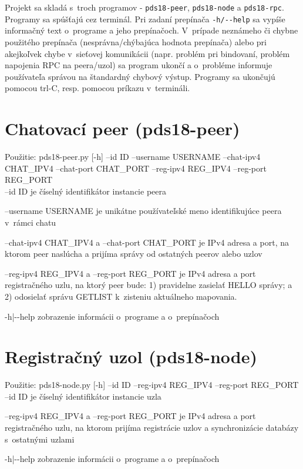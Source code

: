 Projekt sa skladá s~troch programov \-- \texttt{pds18-peer}, \texttt{pds18-node} a  \texttt{pds18-rpc}.
Programy sa spúšťajú cez terminál. Pri zadaní prepínača \texttt{-h/-{}-help} sa vypíše informačný text o~programe a jeho prepínačoch. V~prípade neznámeho či chybne použitého prepínača (nesprávna/chýbajúca hodnota prepínača) alebo pri akejkoľvek chybe v~sieťovej komunikácii (napr. problém pri bindovaní, problém napojenia RPC na peera/uzol) sa program ukončí a o~probléme informuje používateľa správou na štandardný chybový výstup. Programy sa ukončujú pomocou trl-C, resp. pomocou príkazu  v~termináli.

\section{Chatovací peer (pds18-peer)}

\begin{framed}
Použitie: pds18-peer.py [-h] --id ID --username USERNAME --chat-ipv4 CHAT\_IPV4
--chat-port CHAT\_PORT --reg-ipv4 REG\_IPV4 --reg-port
REG\_PORT\\

--id ID je číselný identifikátor instancie peera

--username USERNAME je unikátne používateľské meno identifikujúce peera v~rámci chatu

--chat-ipv4 CHAT\_IPV4 a --chat-port CHAT\_PORT je IPv4 adresa a port, na ktorom peer naslúcha a prijíma správy od ostatných peerov alebo uzlov

--reg-ipv4 REG\_IPV4 a --reg-port REG\_PORT je IPv4 adresa a port registračného uzlu, na ktorý peer bude: 1) pravidelne zasielať HELLO správy; a 2) odosielať správu GETLIST k~zisteniu aktuálneho mapovania.

-h|-{}-help zobrazenie informácii o~programe a o~prepínačoch
\end{framed}

\section{Registračný uzol (pds18-node)}

\begin{framed}
	Použitie: pds18-node.py [-h] --id ID --reg-ipv4 REG\_IPV4 --reg-port REG\_PORT\\
	
	--id ID je číselný identifikátor instancie uzla
	
	--reg-ipv4 REG\_IPV4 a --reg-port REG\_PORT je IPv4 adresa a port registračného uzlu, na ktorom prijíma registrácie uzlov a synchronizácie databázy s~ostatnými uzlami
	
	-h|-{}-help zobrazenie informácii o~programe a o~prepínačoch
\end{framed}

